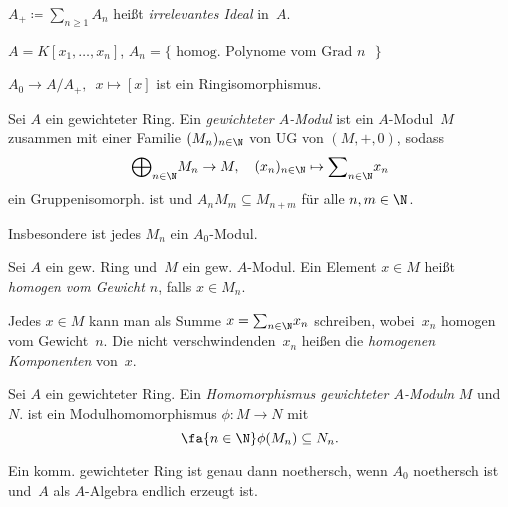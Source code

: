 \documentclass{cheat-sheet}
\begin{document}
\begin{defn}
  $A_+ \coloneqq {\sum}_{n \geq 1} A_n$ heißt \emph{irrelevantes Ideal} in~$A$.
\end{defn}

\begin{bsp}
  $A = K[x_1, \ldots, x_n]$, $A_n = \{ \text{ homog. Polynome vom Grad $n$ } \}$
\end{bsp}

\begin{prop}
  $A_0 \to A / A_+, \enspace x \mapsto [x]$ \quad
  ist ein Ringisomorphismus.
\end{prop}

\begin{defn}
  Sei $A$ ein gewichteter Ring.
  Ein \emph{gewichteter $A$-Modul} ist ein $A$-Modul~$M$ zusammen mit einer Familie $(M_n)_{n \in \N}$ von UG von $(M, +, 0)$, sodass
  \[
    {\bigoplus}_{n \in \N} M_n \to M, \quad
    (x_n)_{n \in \N} \mapsto {\sum}_{n \in \N} x_n
  \]
  ein Gruppenisomorph. ist und $A_n M_m \subseteq M_{n+m}$ für alle $n, m \in \N$.
\end{defn}

\begin{bem}
  Insbesondere ist jedes $M_n$ ein $A_0$-Modul.
\end{bem}

\begin{sprechweise}
  Sei $A$ ein gew. Ring und~$M$ ein gew. $A$-Modul.
  Ein Element $x \in M$ heißt \emph{homogen} \textit{vom Gewicht $n$}, falls $x \in M_n$.
\end{sprechweise}

\begin{bem}
  Jedes $x \in M$ kann man als Summe $x = {\sum}_{n \in \N} x_n$ schreiben, wobei~$x_n$ homogen vom Gewicht~$n$.
  Die nicht verschwindenden~$x_n$ heißen die \textit{homogenen Komponenten} von~$x$.
\end{bem}

\begin{defn}
  Sei $A$ ein gewichteter Ring.
  Ein \textit{Homomorphismus gewichteter $A$-Moduln} $M$ und~$N$. ist ein Modulhomomorphismus $\phi : M \to N$ mit
  \[
    \fa{n \in \N} \phi(M_n) \subseteq N_n.
  \]
\end{defn}


\begin{prop}
  Ein komm. gewichteter Ring ist genau dann noethersch, wenn $A_0$ noethersch ist und~$A$ als $A$-Algebra endlich erzeugt ist.
\end{prop}
\end{document}
